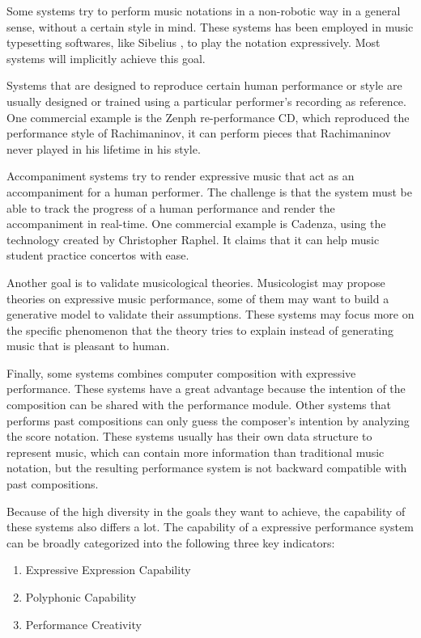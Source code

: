Some systems try to perform music notations in a non-robotic way in a general sense, without a certain style in mind. These systems has been employed in music typesetting softwares, like Sibelius \cite{sibelius}, to play the notation expressively. Most systems will implicitly achieve this goal.

Systems that are designed to reproduce certain human performance or style are usually designed or trained using a particular performer's recording as reference. One commercial example is the Zenph re-performance CD\cite{zenph}, which reproduced the performance style of Rachimaninov, it can perform pieces that Rachimaninov never played in his lifetime in his style. 


Accompaniment systems try to render expressive music that act as an accompaniment for a human performer. The challenge is that the system must be able to track the progress of a human performance and render the accompaniment in real-time. One commercial example is Cadenza\cite{cadenza}, using the technology created by Christopher Raphel\cite{chris}. It claims that it can help music student practice concertos with ease.

Another goal is to validate musicological theories. Musicologist may propose theories on expressive music performance, some of them may want to build a generative model to validate their assumptions. These systems may focus more on the specific phenomenon that the theory tries to explain instead of generating music that is pleasant to human. 

Finally, some systems combines computer composition with expressive performance. These systems have a great advantage because the intention of the composition can be shared with the performance module. Other systems that performs past compositions can only guess the composer's intention by analyzing the score notation. These systems usually has their own data structure to represent music, which can contain more information than traditional music notation, but the resulting performance system is not backward compatible with past compositions.

Because of the high diversity in the goals they want to achieve, the capability of these systems also differs a lot. The capability of a expressive performance system can be broadly categorized into the following three key indicators\cite{THEBOOK}:
\begin{enumerate}
   \item Expressive Expression Capability
   \item Polyphonic Capability
   \item Performance Creativity
\end{enumerate}

